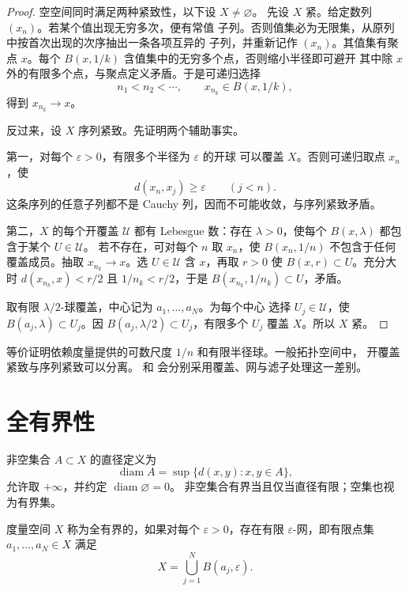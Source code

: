 \begin{proof}
空空间同时满足两种紧致性，以下设 \(X\ne\varnothing\)。
先设 \(X\) 紧。给定数列 \((x_n)\)。若某个值出现无穷多次，便有常值
子列。否则值集必为无限集，从原列中按首次出现的次序抽出一条各项互异的
子列，并重新记作 \((x_n)\)。其值集有聚点 \(x\)。每个
\(B(x,1/k)\) 含值集中的无穷多个点，否则缩小半径即可避开
其中除 \(x\) 外的有限多个点，与聚点定义矛盾。于是可递归选择
\[
 n_1<n_2<\cdots,\qquad x_{n_k}\in B(x,1/k),
\]
得到 \(x_{n_k}\to x\)。

反过来，设 \(X\) 序列紧致。先证明两个辅助事实。

第一，对每个 \(\varepsilon>0\)，有限多个半径为 \(\varepsilon\) 的开球
可以覆盖 \(X\)。否则可递归取点 \(x_n\)，使
\[
 d(x_n,x_j)\ge\varepsilon\qquad(j<n).
\]
这条序列的任意子列都不是 Cauchy 列，因而不可能收敛，与序列紧致矛盾。

第二，\(X\) 的每个开覆盖 \(\mathcal U\) 都有 Lebesgue 数：存在
\(\lambda>0\)，使每个 \(B(x,\lambda)\) 都包含于某个 \(U\in\mathcal U\)。
若不存在，可对每个 \(n\) 取 \(x_n\)，使
\(B(x_n,1/n)\) 不包含于任何覆盖成员。抽取
\(x_{n_k}\to x\)。选 \(U\in\mathcal U\) 含 \(x\)，再取
\(r>0\) 使 \(B(x,r)\subset U\)。充分大时
\(d(x_{n_k},x)<r/2\) 且 \(1/n_k<r/2\)，于是
\(B(x_{n_k},1/n_k)\subset U\)，矛盾。

取有限 \(\lambda/2\)-球覆盖，中心记为 \(a_1,\ldots,a_N\)。为每个中心
选择 \(U_j\in\mathcal U\)，使 \(B(a_j,\lambda)\subset U_j\)。因
\(B(a_j,\lambda/2)\subset U_j\)，有限多个 \(U_j\) 覆盖 \(X\)。所以
\(X\) 紧。
\end{proof}

等价证明依赖度量提供的可数尺度 \(1/n\) 和有限半径球。一般拓扑空间中，
开覆盖紧致与序列紧致可以分离。
和
会分别采用覆盖、网与滤子处理这一差别。

\section{全有界性}

非空集合 \(A\subset X\) 的直径定义为
\[
 \operatorname{diam}A=\sup\{d(x,y):x,y\in A\},
\]
允许取 \(+\infty\)，并约定 \(\operatorname{diam}\varnothing=0\)。
非空集合有界当且仅当直径有限；空集也视为有界集。

\begin{definition}[全有界]
度量空间 \(X\) 称为全有界的，如果对每个 \(\varepsilon>0\)，存在有限
\(\varepsilon\)-网，即有限点集 \(a_1,\ldots,a_N\in X\) 满足
\[
 X=\bigcup_{j=1}^N B(a_j,\varepsilon).
\]
\end{definition}

